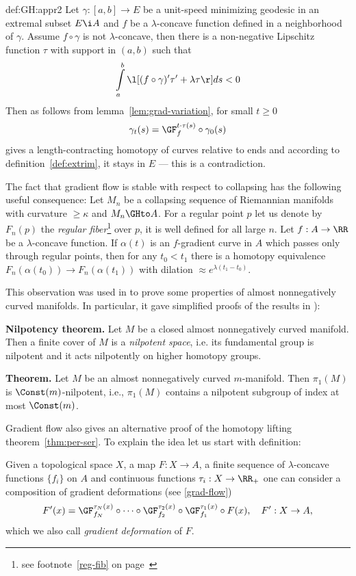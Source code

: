 {\begin{subthm}{def:GH:appr2}
 Let $\gamma:[a,b]\to E$ be a unit-speed minimizing geodesic in an extremal subset
$E\i A$ and $f$ be a $\lambda$-concave function defined in a neighborhood of
$\gamma$.
Assume $f\circ\gamma$ is not $\lambda$-concave, then there is a non-negative
Lipschitz function $\tau$ with support in $(a,b)$ such that
$$\int\limits_a^b\l[(f\circ\gamma)'\tau'+\lambda\tau\r]d s< 0$$
Then as follows from lemma~\ref{lem:grad-variation}, for small $t\ge 0$
$$\gamma_t(s)=\GF^{t\cdot\tau(s)}_f \circ\gamma_0(s)$$
gives a length-contracting homotopy of curves relative to ends and according to
definition~\ref{def:extrim}, it stays in $E$ --- this is a contradiction.\qeds

The fact that gradient flow is stable with respect to collapsing has the
following useful consequence: Let $M_n$ be a collapsing sequence of Riemannian
manifolds with curvature $\ge\kappa$ and $M_n\GHto A$.
For a regular point $p$ let us denote by $F_n(p)$ the \emph{regular fiber}\footnote{see footnote~\ref{reg-fib} on page~\pageref{reg-fib}} over $p$, it is well defined for all large $n$.
Let $f:A\to\RR$ be a $\lambda$-concave function.
If $\alpha(t)$ is an $f$-gradient curve in $A$  which passes only through
regular points, then for any $t_0<t_1$
there is a homotopy equivalence $F_n(\alpha(t_0))\to F_n(\alpha(t_1))$ with
dilation $\approx e^{\lambda(t_1-t_0)}$.

This observation was used in \cite{KPT} to prove some properties of almost
nonnegatively curved manifolds. 
In particular, it gave simplified proofs of
the results in \cite{FY}):

\begin{thm}{\bf Nilpotency theorem.} Let $M$ be a closed almost nonnegatively curved manifold.
Then a finite cover of $M$ is a \emph{nilpotent space},
 i.e. its fundamental group is nilpotent and it acts nilpotently on higher homotopy groups.
\end{thm}

\begin{thm}{\bf Theorem.} Let $M$ be an almost nonnegatively curved
$m$-manifold. Then $\pi_1(M)$ is $\Const(m)$-nilpotent, i.e., $\pi_1(M)$ contains a nilpotent subgroup of
index at most $\Const(m)$.
\end{thm}

Gradient flow also gives an alternative proof of the homotopy lifting theorem~\ref{thm:per-ser}. 
To explain the idea let us start with definition:

Given a topological space $X$, a map $F:X\to A$, a finite sequence of $\lambda$-concave functions $\{f_i\}$ on $A$ and continuous functions $\tau_i:X\to\RR_+$ one can consider a composition of gradient deformations (see \ref{grad-flow})
$$F'(x)=\GF_{f_N}^{\tau_N(x)}\circ\cdots\circ\GF_{f_2}^{\tau_2(x)}\circ\GF_{f_1}^{\tau_1(x)}\circ F(x),\ \ \ F':X\to A,$$
which we also call \textit{gradient deformation} of $F$.


\end{subthm}}
